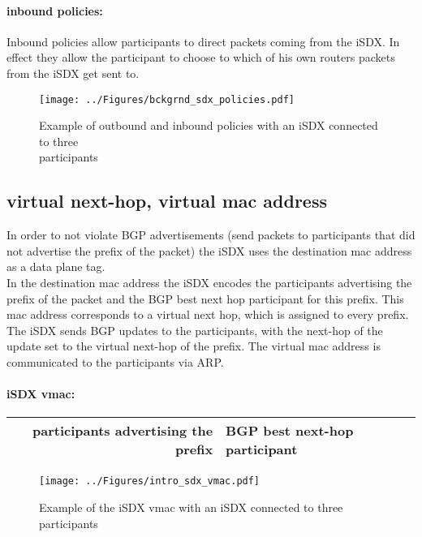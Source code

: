 \paragraph{\label{chapter2:iSDX:policies:inbound policies}inbound policies:}
Inbound policies allow participants to direct packets coming from the iSDX. In effect they allow the participant to choose to which of his own routers packets from the iSDX get sent to. 

\begin{figure}[h]
\texttt{[image: ../Figures/bckgrnd\_sdx\_policies.pdf]}
\caption{Example of outbound and inbound policies with an iSDX connected to three \\ participants}
\end{figure}


\subsection{\label{chapter2:iSDX:virtual next-hop, virtual mac address}virtual next-hop, virtual mac address}
In order to not violate BGP advertisements (send packets to participants that did not advertise the prefix of the packet) the iSDX uses the destination mac address as a data plane tag. \\ 
In the destination mac address the iSDX encodes the participants advertising the prefix of the packet and the BGP best next hop participant for this prefix. This mac address corresponds to a virtual next hop, which is assigned to every prefix. \\ The iSDX sends BGP updates to the participants, with the next-hop of the update set to the virtual next-hop of the prefix. The virtual mac address is communicated to the participants via ARP.
\paragraph{\label{chapter2:iSDX:virtual next-hop :inbound policies}iSDX vmac:}

\begin{tabular}{|r|l|}
  \hline 
  participants advertising the prefix & BGP best next-hop participant \\
  \hline
\end{tabular}

\begin{figure}[h]
\texttt{[image: ../Figures/intro\_sdx\_vmac.pdf]}
\caption{Example of the iSDX vmac with an iSDX connected to three participants}
\end{figure}

